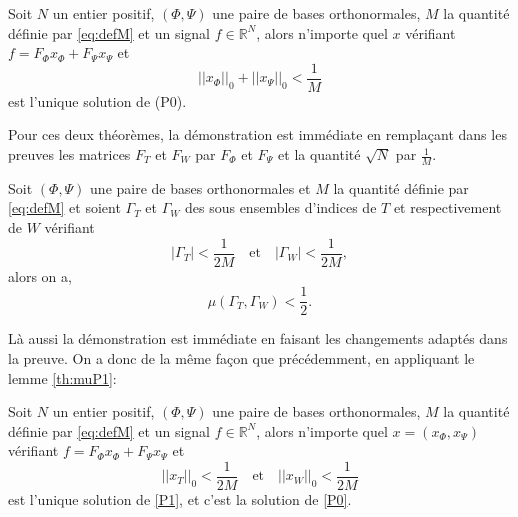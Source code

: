 	\begin{theoreme}\label{th:IncertGen2}
		Soit $N$ un entier positif, $(\Phi,\Psi)$ une paire de bases orthonormales, $M$ la quantité définie par \ref{eq:defM} et un signal $f \in \mathbb{R}^N$, alors n'importe quel $x$ vérifiant $f = F_\Phi x_\Phi + F_\Psi x_\Psi$ et 
		\begin{equation}\label{eq:Incert1}
			||x_\Phi||_0 + ||x_\Psi||_0 < \frac{1}{M}
		\end{equation}
		est l'unique solution de (P0).
	\end{theoreme}
	Pour ces deux théorèmes, la démonstration est immédiate en remplaçant dans les preuves les matrices $F_T$ et $F_W$ par $F_\Phi$ et $F_\Psi$ et la quantité $\sqrt{N}$ par $\frac{1}{M}$.
	\begin{lemme}\label{th:muFDGen}
		Soit $(\Phi,\Psi)$ une paire de bases orthonormales et $M$ la quantité définie par \ref{eq:defM} et soient $\Gamma_T$  et $\Gamma_W$ des sous ensembles d'indices de $T$ et respectivement de $W$ vérifiant
		\begin{equation}
			|\Gamma_T| < \frac{1}{2M} \quad \text{et} \quad |\Gamma_W| < \frac{1}{2M},
		\end{equation}
		alors on a,
		\begin{equation}
			\mu(\Gamma_T, \Gamma_W) < \frac{1}{2}.
		\end{equation}
	\end{lemme}
	Là aussi la démonstration est immédiate en faisant les changements adaptés dans la preuve.
	On a donc de la même façon que précédemment, en appliquant le lemme \ref{th:muP1}:
	\begin{theoreme}\label{th:recovgen}
		Soit $N$ un entier positif, $(\Phi, \Psi)$ une paire de bases orthonormales, $M$ la quantité définie par \ref{eq:defM} et un signal $f\in \mathbb{R}^N$, alors n'importe quel $x = (x_\Phi, x_\Psi)$ vérifiant $f = F_\Phi x_\Phi + F_\Psi x_\Psi$ et
	\begin{equation}\label{eq:cond1}
		||x_T||_0 < \frac{1}{2M} \quad \text{et} \quad   ||x_W||_0 < \frac{1}{2M}
	\end{equation}
	est l'unique solution de \ref{P1}, et c'est la solution de \ref{P0}.
\end{theoreme}

